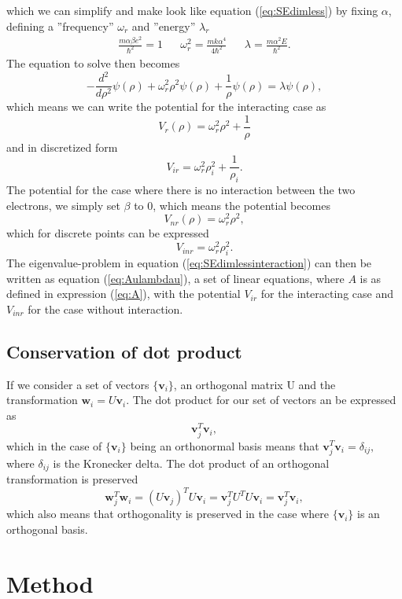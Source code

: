 \documentclass[norsk,a4paper,12pt]{article}
\begin{document}
which we can simplify and make look like equation (\ref{eq:SEdimless}) by fixing $\alpha$, defining a ''frequency'' $\omega _r$ and ''energy'' $\lambda_r$
\begin{align*}
\frac{m\alpha\beta e^2}{\hbar^2} = 1 && \omega_r^2 = \frac{mk\alpha^4}{4\hbar^2} && \lambda = \frac{m\alpha^2E}{\hbar^2}.
\end{align*}
The equation to solve then becomes \begin{equation}
-\frac{d^2}{d\rho ^2}\psi (\rho) + \omega_r^2\rho^2\psi(\rho) + \frac{1}{\rho}\psi(\rho) = \lambda \psi (\rho),
\label{eq:SEdimlessinteraction}
\end{equation}
which means we can write the potential for the interacting case as $$V_r(\rho) = \omega_r^2\rho^2 + \frac{1}{\rho}$$
and in discretized form $$V_{ir} = \omega_r^2\rho_i^2 + \frac{1}{\rho_i}.$$ The potential for the case where there is no interaction between the two electrons, we simply set $\beta$ to $0$, which means the potential becomes $$V_{nr}(\rho) = \omega_r^2 \rho^2,$$ which for discrete points can be expressed
$$V_{inr} = \omega_r^2\rho_i^2.$$
The eigenvalue-problem in equation (\ref{eq:SEdimlessinteraction}) can then be written as equation (\ref{eq:Aulambdau}), a set of linear equations, where $A$ is as defined in expression (\ref{eq:A}), with the potential $V_{ir}$ for the interacting case and $V_{inr}$ for the case without interaction.
\subsection{Conservation of dot product}
If we consider a set of vectors $\{\textbf{v}_i\}$, an orthogonal matrix U and the transformation $\textbf{w}_i = U\textbf{v}_i$. The dot product for our set of vectors an be expressed as $$\textbf{v}_j^T\textbf{v}_i,$$ which in the case of $\{\textbf{v}_i\}$ being an orthonormal basis means that $\textbf{v}_j^T\textbf{v}_i = \delta_{ij},$ where $\delta_{ij}$ is the Kronecker delta. The dot product of an orthogonal transformation is preserved
$$\textbf{w}_j^T \textbf{w}_i = (U\textbf{v}_j)^TU\textbf{v}_i = \textbf{v}_j^TU^TU\textbf{v}_i = \textbf{v}_j^T\textbf{v}_i,$$ which also means that orthogonality is preserved in the case where $\{\textbf{v}_i\}$ is an orthogonal basis.
\section{Method}
\end{document}
